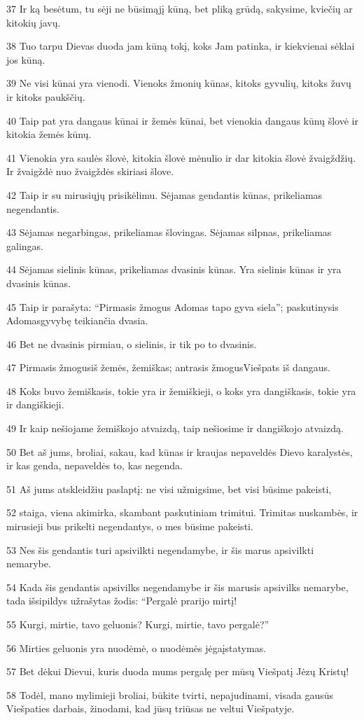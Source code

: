 \par 37 Ir ką besėtum, tu sėji ne būsimąjį kūną, bet pliką grūdą, sakysime, kviečių ar kitokių javų. 
\par 38 Tuo tarpu Dievas duoda jam kūną tokį, koks Jam patinka, ir kiekvienai sėklai jos kūną. 
\par 39 Ne visi kūnai yra vienodi. Vienoks žmonių kūnas, kitoks gyvulių, kitoks žuvų ir kitoks paukščių. 
\par 40 Taip pat yra dangaus kūnai ir žemės kūnai, bet vienokia dangaus kūnų šlovė ir kitokia žemės kūnų. 
\par 41 Vienokia yra saulės šlovė, kitokia šlovė mėnulio ir dar kitokia šlovė žvaigždžių. Ir žvaigždė nuo žvaigždės skiriasi šlove. 
\par 42 Taip ir su mirusiųjų prisikėlimu. Sėjamas gendantis kūnas, prikeliamas negendantis. 
\par 43 Sėjamas negarbingas, prikeliamas šlovingas. Sėjamas silpnas, prikeliamas galingas. 
\par 44 Sėjamas sielinis kūnas, prikeliamas dvasinis kūnas. Yra sielinis kūnas ir yra dvasinis kūnas. 
\par 45 Taip ir parašyta: “Pirmasis žmogus Adomas tapo gyva siela”; paskutinysis Adomas­gyvybę teikiančia dvasia. 
\par 46 Bet ne dvasinis pirmiau, o sielinis, ir tik po to dvasinis. 
\par 47 Pirmasis žmogus­iš žemės, žemiškas; antrasis žmogus­Viešpats iš dangaus. 
\par 48 Koks buvo žemiškasis, tokie yra ir žemiškieji, o koks yra dangiškasis, tokie yra ir dangiškieji. 
\par 49 Ir kaip nešiojame žemiškojo atvaizdą, taip nešiosime ir dangiškojo atvaizdą. 
\par 50 Bet aš jums, broliai, sakau, kad kūnas ir kraujas nepaveldės Dievo karalystės, ir kas genda, nepaveldės to, kas negenda. 
\par 51 Aš jums atskleidžiu paslaptį: ne visi užmigsime, bet visi būsime pakeisti,­ 
\par 52 staiga, viena akimirka, skambant paskutiniam trimitui. Trimitas nuskambės, ir mirusieji bus prikelti negendantys, o mes būsime pakeisti. 
\par 53 Nes šis gendantis turi apsivilkti negendamybe, ir šis marus apsivilkti nemarybe. 
\par 54 Kada šis gendantis apsivilks negendamybe ir šis marusis apsivilks nemarybe, tada išsipildys užrašytas žodis: “Pergalė prarijo mirtį! 
\par 55 Kurgi, mirtie, tavo geluonis? Kurgi, mirtie, tavo pergalė?” 
\par 56 Mirties geluonis yra nuodėmė, o nuodėmės jėga­įstatymas. 
\par 57 Bet dėkui Dievui, kuris duoda mums pergalę per mūsų Viešpatį Jėzų Kristų! 
\par 58 Todėl, mano mylimieji broliai, būkite tvirti, nepajudinami, visada gausūs Viešpaties darbais, žinodami, kad jūsų triūsas ne veltui Viešpatyje.


